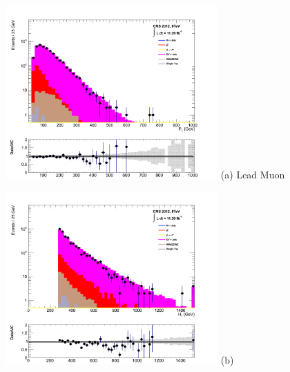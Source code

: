 \begin{itemize}
\begin{minipage}{\linewidth}
\centering
\begin{minipage}{.48\textwidth}
\centering
\includegraphics[width = 3.2in]{plots/dimuon_leadmu_datamc.pdf}
(a) Lead Muon \pt
\end{minipage}
\begin{minipage}{.48\textwidth}
\centering
\includegraphics[width = 3.2in]{plots/dimuon_ht_datamc.pdf}
(b) \theht
\end{minipage}
\end{minipage}

\xspace


\end{itemize}
